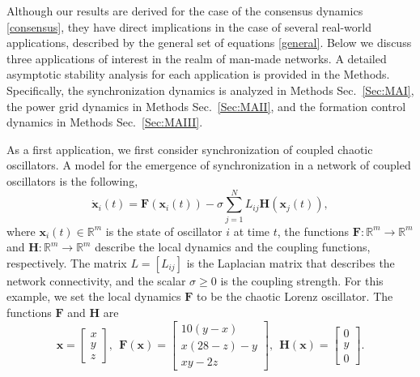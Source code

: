 \documentclass[%
 reprint,
 amsmath,amssymb,
 aip,
]{revtex4-2}
\def \bF {\pmb{F}}
\def \bH {\pmb{H}}
\def \bx {\pmb{x}}
\theoremstyle{italichead}
\theoremstyle{definition}
\begin{document}
{Although our results are derived for the case of the consensus dynamics \eqref{consensus},  they have direct implications in the case of several real-world applications, described by the general set of equations \eqref{general}.
Below we discuss three applications of interest in the realm of man-made networks. %
{A detailed asymptotic stability analysis for each application is provided in the Methods. Specifically, the synchronization dynamics is analyzed in Methods Sec.\ \ref{Sec:MAI}, the power grid dynamics in Methods Sec.\ \ref{Sec:MAII}, and the formation control dynamics in Methods Sec.\ \ref{Sec:MAIII}.}





As a first application, we first consider  synchronization of coupled chaotic oscillators.
A model for the emergence of synchronization in a network of coupled oscillators is the following,
\begin{equation} \label{eq:synch}
    \dot{\bx}_i (t) = \bF(\bx_i(t)) - \sigma \sum_{j = 1}^N L_{ij} \bH(\bx_j (t)),
\end{equation}
where $\bx_i(t) \in \mathbb{R}^m$ is the state of oscillator $i$ at time $t$, the functions $\bF: \mathbb{R}^m \to \mathbb{R}^m$ and $\bH: \mathbb{R}^m \to \mathbb{R}^m$ describe the local dynamics and the coupling functions, respectively. 
The matrix $L = [L_{ij}]$ is the Laplacian matrix that describes the network connectivity, and the scalar $\sigma \geq 0$ is the coupling strength. For this example, we set  the local dynamics $\bF$ to be the chaotic Lorenz oscillator. The functions $\bF$ and $\bH$ are
\begin{equation} \label{eq:Lorenz}
        \bx = \begin{bmatrix}
        x \\ y \\ z
    \end{bmatrix}, \ \
    \bF(\bx) = \begin{bmatrix} 10(y-x) \\
    x(28 - z) - y \\
    xy - 2 z \end{bmatrix}, \ \  \bH(\bx) = \begin{bmatrix}
        0  \\
        y  \\
        0 
    \end{bmatrix}.
\end{equation}

}
\end{document}
